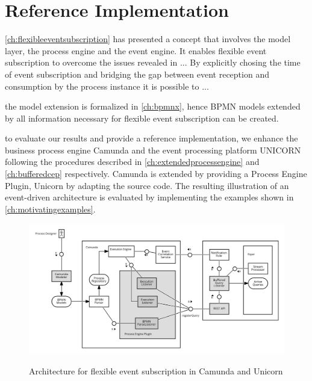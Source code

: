 \chapter{Reference Implementation}\label{ch:implementation}

\autoref{ch:flexibleeventsubscription} has presented a concept that involves the model layer, the process engine and the event engine.
It enables flexible event subscription to overcome the issues revealed in ...
By explicitly chosing the time of event subscription and bridging the gap between event reception and consumption by the process instance it is possible to ...

the model extension is formalized in \autoref{ch:bpmnx}, hence BPMN models extended by all information necessary for flexible event subscription can be created.

to evaluate our results and provide a reference implementation, we enhance the business process engine Camunda and the event processing platform UNICORN following the procedures described in \autoref{ch:extendedprocessengine} and \autoref{ch:bufferedcep} respectively.
Camunda is extended by providing a Process Engine Plugin, Unicorn by adapting the source code.
The resulting illustration of an event-driven architecture is evaluated by implementing the examples shown in \autoref{ch:motivatingexamples}.

\begin{figure}[]
	\myfloatalign
	{\hspace*{-2.3cm}\includegraphics[width=1.3\linewidth]{chapters/implementation/flexible-evt-subscr-camunda-unicorn.png}}
	\caption{Architecture for flexible event subscription in Camunda and Unicorn}
	\label{fig:architecture-camunda-unicorn}
\end{figure}

